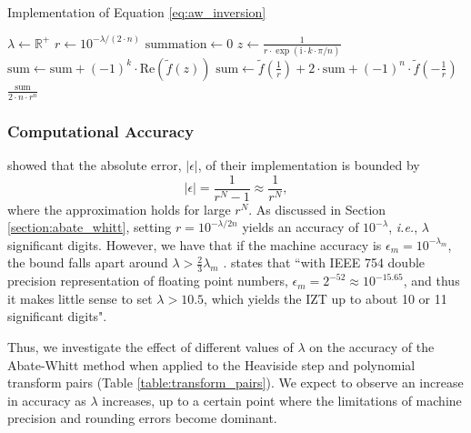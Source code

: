 \documentclass[a4paper]{report}
\begin{document}
\begin{algorithm}[H]
    \caption{Implementation of Equation \ref{eq:aw_inversion}}
    \label{algo:abate_whitt}
    \begin{algorithmic}[1]
        \State $\lambda \gets \mathbb{R}^+$
        \State $r \gets 10^{-\lambda / (2 \cdot n)}$
        \State $\text{summation} \gets 0$
            \State $z \gets \frac{1}{r \cdot \exp(\text{i} \cdot k \cdot \pi / n)}$
            \State $\text{sum} \gets \text{sum} + (-1)^k \cdot \text{Re}(\tilde{f}(z))$
        \EndFor
        \State $\text{sum} \gets \tilde{f}(\frac{1}{r}) + 2 \cdot \text{sum} + (-1)^n \cdot \tilde{f}(-\frac{1}{r})$
        \State \Return $\frac{\text{sum}}{2 \cdot n \cdot r^n}$
    \EndProcedure
    \end{algorithmic}
\end{algorithm}

\subsubsection{Computational Accuracy}\label{sec:aw_accuracy}
\citet{AbateWhitt1992a, AbateWhitt1992b} showed that the absolute error, $|\epsilon |$, of their implementation is bounded by
\begin{equation}
	| \epsilon | = \frac{1}{r^N - 1} \approx \frac{1}{r^N},
\end{equation}
where the approximation holds for large $r^N$. As discussed in Section \ref{section:abate_whitt}, setting $r=10^{-\lambda / 2n}$  yields an accuracy of $10^{-\lambda}$, \textit{i.e.}, $\lambda$ significant digits. However, we have that if the machine accuracy is $\epsilon_m = 10^{-\lambda_m}$, the bound falls apart around $\lambda > \frac{2}{3} \lambda_m$ \citep[Remark 5.8]{AbateWhitt1992a}. \citet{loveless2023phelanguido} states that ``with IEEE 754 double precision representation of floating point numbers, $\epsilon_m = 2^{-52} \approx 10^{-15.65}$, and thus it makes little sense to set $\lambda > 10.5$, which yields the IZT up to about 10 or 11 significant digits".

Thus, we investigate the effect of different values of $\lambda$ on the accuracy of the Abate-Whitt method when applied to the Heaviside step and polynomial transform pairs (Table \ref{table:transform_pairs}). We expect to observe an increase in accuracy as $\lambda$ increases, up to a certain point where the limitations of machine precision and rounding errors become dominant.
\end{document}
